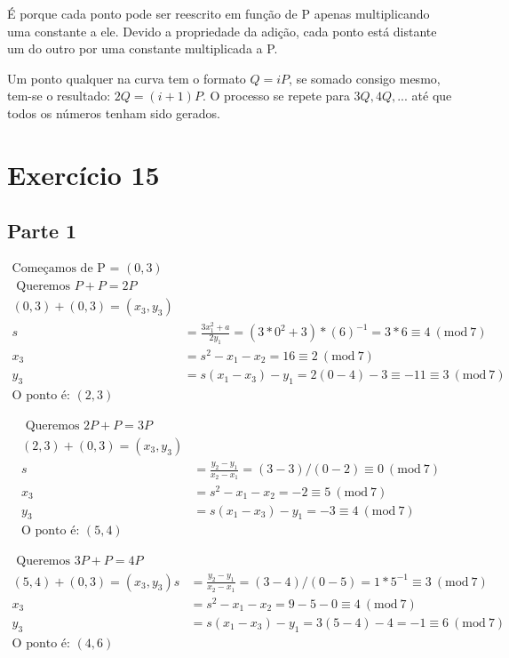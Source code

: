 \documentclass[a4paper]{article}
\newcommand{\Mod}[1]{\ (\mathrm{mod}\ #1)}
\begin{document}
É porque cada ponto pode ser reescrito em função de P apenas multiplicando uma constante a ele. Devido a propriedade da adição,
cada ponto está distante um do outro por uma constante multiplicada a P.

Um ponto qualquer na curva tem o formato $Q = iP$, se somado consigo mesmo, tem-se o resultado: $2Q = (i+1)P$. O processo se repete
para $3Q, 4Q, ...$ até que todos os números tenham sido gerados.

\section{Exercício 15}\label{sec:Ex15}

\subsection{Parte 1}

\begin{equation}
  \begin{align*}
    \text{Começamos de P = }(0, 3)\\
    \text{ Queremos }P+P = 2P\\
    (0, 3) + (0, 3) = (x_3, y_3)\\
    s &= \frac{3x_1^2 + a}{2y_1} = (3*0^2 + 3) * (6)^{-1} = 3 * 6 \equiv 4 \Mod{7}\\
    x_3 &= s^2 - x_1 - x_2 = 16 \equiv 2 \Mod{7}\\
    y_3 &= s(x_1 - x_3) - y_1 = 2(0 - 4) - 3 \equiv -11 \equiv 3 \Mod{7}\\
    \text{O ponto é: }(2, 3)
  \end{align*}
\end{equation}

\begin{equation}
  \begin{align*}
    \text{ Queremos }2P+P = 3P\\
    (2, 3) + (0, 3) = (x_3, y_3)\\
    s &= \frac{y_2 - y_1}{x_2 - x_1} = (3 - 3)/(0 - 2) \equiv 0 \Mod{7}\\
    x_3 &= s^2 - x_1 - x_2 = -2 \equiv 5 \Mod{7}\\
    y_3 &= s(x_1 - x_3) - y_1 = -3 \equiv 4 \Mod{7}\\
    \text{O ponto é: }(5, 4)
  \end{align*}
\end{equation}

\begin{equation}
  \begin{align*}
    \text{ Queremos }3P+P = 4P\\
    (5, 4) + (0, 3) = (x_3, y_3)
    s &= \frac{y_2 - y_1}{x_2 - x_1} = (3 - 4)/(0 - 5) = 1 * 5^{-1} \equiv 3 \Mod{7}\\
    x_3 &= s^2 - x_1 - x_2 = 9 - 5 - 0 \equiv 4 \Mod{7}\\
    y_3 &= s(x_1 - x_3) - y_1 = 3(5 - 4) - 4 = -1 \equiv 6 \Mod{7}\\
    \text{O ponto é: }(4, 6)
  \end{align*}
\end{equation}
\end{document}
